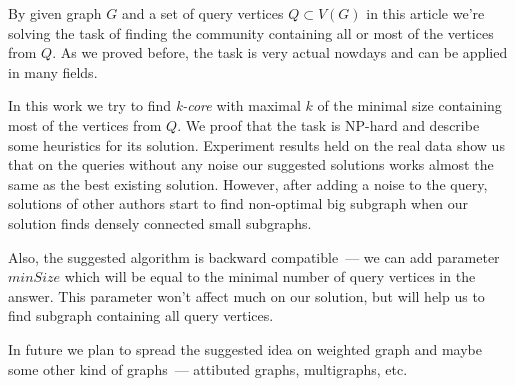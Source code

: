 \startconclusionpage

By given graph $G$ and a set of query vertices $Q \subset V(G)$ in this article we're solving the task of finding the community containing all or most of the vertices from $Q$. As we proved before, the task is very actual nowdays and can be applied in many fields.

In this work we try to find \textit{k-core} with maximal $k$ of the minimal size containing most of the vertices from $Q$. We proof that the task is NP-hard and describe some heuristics for its solution. Experiment results held on the real data show us that on the queries without any noise our suggested solutions works almost the same as the best existing solution. However, after adding a noise to the query, solutions of other authors start to find non-optimal big subgraph when our solution finds densely connected small subgraphs.

Also, the suggested algorithm is backward compatible~--- we can add parameter $minSize$ which will be equal to the minimal number of query vertices in the answer. This parameter won't affect much on our solution, but will help us to find subgraph containing all query vertices.

In future we plan to spread the suggested idea on weighted graph and maybe some other kind of graphs~--- attibuted graphs, multigraphs, etc.
